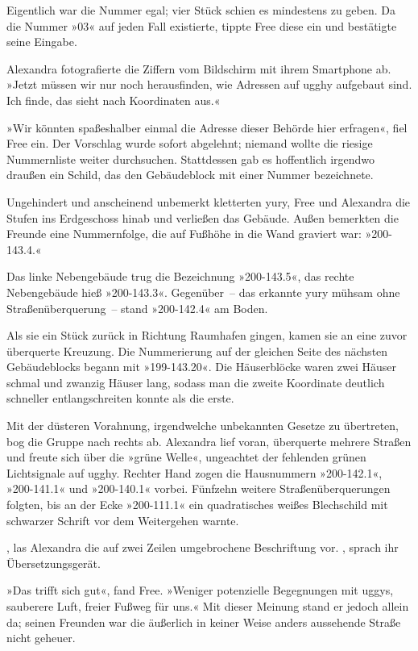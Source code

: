 Eigentlich war die Nummer egal; vier Stück schien es mindestens zu geben. Da die Nummer »03« auf jeden Fall existierte, tippte Free diese ein und bestätigte seine Eingabe. 

Alexandra fotografierte die Ziffern vom Bildschirm mit ihrem Smartphone ab. »Jetzt müssen wir nur noch herausfinden, wie Adressen auf ugghy aufgebaut sind. Ich finde, das sieht nach Koordinaten aus.«

»Wir könnten spaßeshalber einmal die Adresse dieser Behörde hier erfragen«, fiel Free ein. Der Vorschlag wurde sofort abgelehnt; niemand wollte die riesige Nummernliste weiter durchsuchen. Stattdessen gab es hoffentlich irgendwo draußen ein Schild, das den Gebäudeblock mit einer Nummer bezeichnete.

Ungehindert und anscheinend unbemerkt kletterten yury, Free und Alexandra die Stufen ins Erdgeschoss hinab und verließen das Gebäude. Außen bemerkten die Freunde eine Nummernfolge, die auf Fußhöhe in die Wand graviert war: »200-143.4.«

Das linke Nebengebäude trug die Bezeichnung »200-143.5«, das rechte Nebengebäude hieß »200-143.3«. Gegenüber~– das erkannte yury mühsam ohne Straßenüberquerung~– stand »200-142.4« am Boden.

Als sie ein Stück zurück in Richtung Raumhafen gingen, kamen sie an eine zuvor überquerte Kreuzung. Die Nummerierung auf der gleichen Seite des nächsten Gebäudeblocks begann mit »199-143.20«. Die Häuserblöcke waren zwei Häuser schmal und zwanzig Häuser lang, sodass man die zweite Koordinate deutlich schneller entlangschreiten konnte als die erste.

Mit der düsteren Vorahnung, irgendwelche unbekannten Gesetze zu übertreten, bog die Gruppe nach rechts ab. Alexandra lief voran, überquerte mehrere Straßen und freute sich über die »grüne Welle«, ungeachtet der fehlenden grünen Lichtsignale auf ugghy. Rechter Hand zogen die Hausnummern »200-142.1«, »200-141.1« und »200-140.1« vorbei. Fünfzehn weitere Straßenüberquerungen folgten, bis an der Ecke »200-111.1« ein quadratisches weißes Blechschild mit schwarzer Schrift vor dem Weitergehen warnte.

, las Alexandra die auf zwei Zeilen umgebrochene Beschriftung vor. , sprach ihr Übersetzungsgerät.

»Das trifft sich gut«, fand Free. »Weniger potenzielle Begegnungen mit uggys, sauberere Luft, freier Fußweg für uns.« Mit dieser Meinung stand er jedoch allein da; seinen Freunden war die äußerlich in keiner Weise anders aussehende Straße nicht geheuer.

